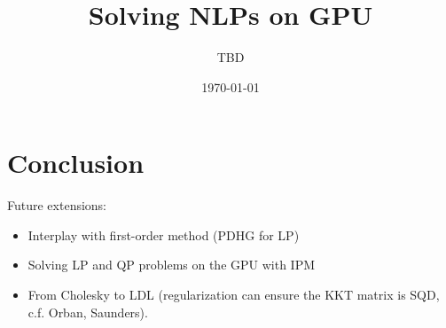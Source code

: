 \documentclass{article}
\title{Solving NLPs on GPU}
\author{TBD}
\date{\today}
\theoremstyle{definition}
\theoremstyle{remark}
\begin{document}
\maketitle

\tableofcontents








\section{Conclusion}
Future extensions:
\begin{itemize}
  \item Interplay with first-order method (PDHG for LP)
  \item Solving LP and QP problems on the GPU with IPM
  \item From Cholesky to LDL (regularization can
    ensure the KKT matrix is SQD, c.f. Orban, Saunders).
\end{itemize}



\end{document}
